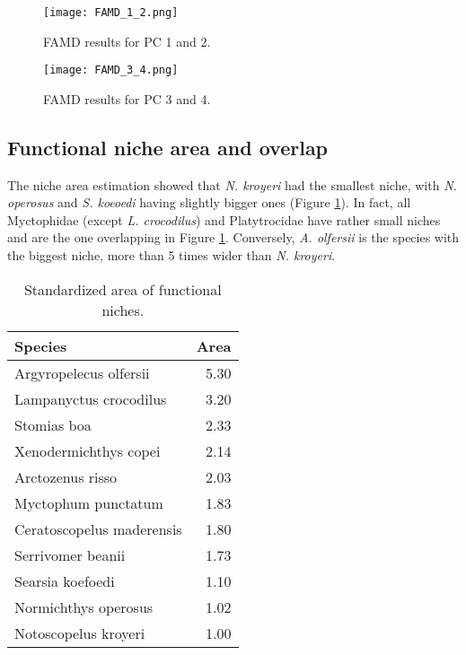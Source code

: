 \begin{figure} [!htbp]
	\begin{center}
		\texttt{[image: FAMD\_1\_2.png]}
	\end{center}
	\caption{FAMD results for PC 1 and 2.}
	\label{fig:famd12}
\end{figure}

\begin{figure} [!htbp]
	\begin{center}
		\texttt{[image: FAMD\_3\_4.png]}
	\end{center}
	\caption{FAMD results for PC 3 and 4.}
	\label{fig:famd34}
\end{figure}


\subsection{Functional niche area and overlap}
The niche area estimation showed that \textit{N. kroyeri} had the smallest niche, with \textit{N. operosus} and \textit{S. koeoedi} having slightly bigger ones (Figure \ref{table:sp_area}). In fact, all Myctophidae (except \textit{L. crocodilus}) and Platytrocidae have rather small niches and are the one overlapping in Figure \ref{fig:famd12}. Conversely, \textit{A. olfersii} is the species with the biggest niche, more than 5 times wider than \textit{N. kroyeri}.


\begin{table}[ht]
\centering
\label{table:sp_area}
\caption{Standardized area of functional niches.}
\begin{adjustbox}{max width=1.1\textwidth,center}
\begin{tabular}{lr}
  \hline
Species & Area \\ 
  \hline
Argyropelecus olfersii & 5.30 \\ 
  Lampanyctus crocodilus & 3.20 \\ 
  Stomias boa & 2.33 \\ 
  Xenodermichthys copei & 2.14 \\ 
  Arctozenus risso & 2.03 \\ 
  Myctophum punctatum & 1.83 \\ 
  Ceratoscopelus maderensis & 1.80 \\ 
  Serrivomer beanii & 1.73 \\ 
  Searsia koefoedi & 1.10 \\ 
  Normichthys operosus & 1.02 \\ 
  Notoscopelus kroyeri & 1.00 \\ 
   \hline
\end{tabular}
\end{adjustbox}
\end{table}

